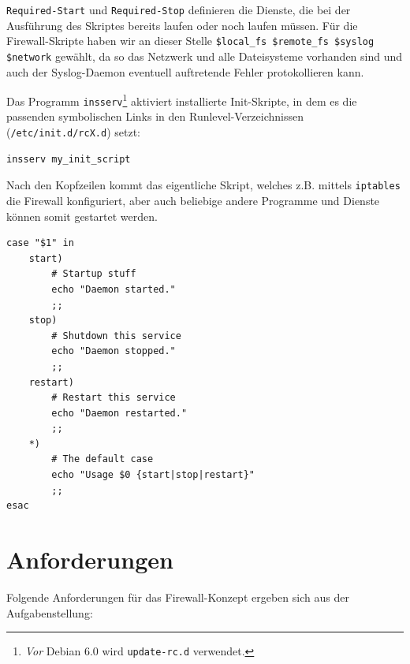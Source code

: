 {\tt Required-Start} und {\tt Required-Stop} definieren die Dienste, die bei
der Aus\-füh\-rung des Skriptes bereits laufen oder noch laufen müssen.
Für die Firewall-Skripte haben wir an dieser Stelle
\verb!$local_fs $remote_fs $syslog $network! gewählt, da so das Netzwerk und
alle Dateisysteme vorhanden sind und auch der Syslog-Daemon eventuell
auftretende Fehler protokollieren kann.

Das Programm {\tt insserv}\footnote{
\emph{Vor} Debian 6.0 wird {\tt update-rc.d} verwendet.
} aktiviert installierte Init-Skripte, in dem es die passenden symbolischen
Links in den Runlevel-Verzeichnissen ({\tt /etc/init.d/rcX.d}) setzt:

\begin{verbatim}
insserv my_init_script
\end{verbatim}

Nach den Kopfzeilen kommt das eigentliche Skript, welches z.B. mittels
{\tt iptables} die Firewall konfiguriert, aber auch beliebige andere Programme
und Dienste können somit gestartet werden.

\begin{lstlisting}[label=lst:lsb-script,caption={Init Script LSB: Eigentliches Skript.}]
case "$1" in
    start)
        # Startup stuff
        echo "Daemon started."
        ;;
    stop)
        # Shutdown this service
        echo "Daemon stopped."
        ;;
    restart)
        # Restart this service
        echo "Daemon restarted."
        ;;
    *)
        # The default case
        echo "Usage $0 {start|stop|restart}"
        ;;
esac
\end{lstlisting}


\section{Anforderungen}

Folgende Anforderungen für das Firewall-Konzept ergeben sich aus der
Aufgabenstellung:

